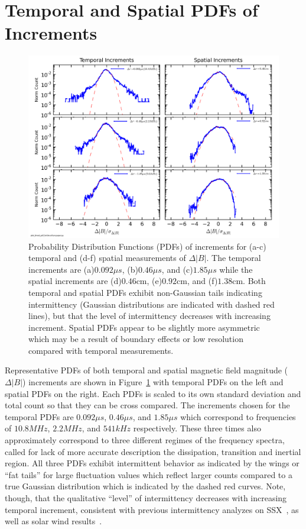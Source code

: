 \documentclass[aps,prl,amsmath,amssymb,reprint,superscriptaddress]{revtex4-1} %
\begin{document}
\section{Temporal and Spatial PDFs of Increments}\label{sec:pdfs}

\begin{figure}[!htbp]
\centerline{
\includegraphics[width=17cm]{Bmod_pdf_temporal_and_spatial_100313Shots41to80_forStructFuncpaper.png}}
\caption{\label{fig:pdfs}Probability Distribution Functions (PDFs) of increments for (a-c) temporal and (d-f) spatial measurements of $\Delta |B|$. The temporal increments are (a)$0.092\mu s$, (b)$0.46\mu s$, and (c)$1.85\mu s$ while the spatial increments are (d)$0.46$cm, (e)$0.92$cm, and (f)$1.38$cm. Both temporal and spatial PDFs exhibit non-Gaussian tails indicating intermittency (Gaussian distributions are indicated with dashed red lines), but that the level of intermittency decreases with increasing increment. Spatial PDFs appear to be slightly more asymmetric which may be a result of boundary effects or low resolution compared with temporal measurements.}
\end{figure}

Representative PDFs of both temporal and spatial magnetic field magnitude ($\Delta |B|$) increments are shown in Figure~\ref{fig:pdfs} with temporal PDFs on the left and spatial PDFs on the right. Each PDFs is scaled to its own standard deviation and total count so that they can be cross compared. The increments chosen for the temporal PDFs are $0.092\mu s$, $0.46\mu s$, and $1.85\mu s$ which correspond to frequencies of $10.8MHz$, $2.2MHz$, and $541kHz$ respectively. These three times also approximately correspond to three different regimes of the frequency spectra, called for lack of more accurate description the dissipation, transition and inertial region. All three PDFs exhibit intermittent behavior as indicated by the wings or ``fat tails'' for large fluctuation values which reflect larger counts compared to a true Gaussian distribution which is indicated by the dashed red curves. Note, though, that the qualitative ``level'' of intermittency decreases with increasing temporal increment, consistent with previous intermittency analyzes on SSX~\cite{schaffner2014a,schaffner2014b}, as well as solar wind results~\cite{bruno2013}.
\end{document}
